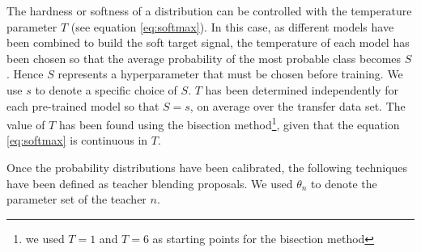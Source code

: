 \documentclass{elsarticle}
\begin{document}
	 The hardness or softness of a distribution can be controlled with the temperature parameter $T$ (see equation \ref{eq:softmax}). In this case, as different models have been combined to build the soft target signal, the temperature of each model has been chosen so that the average probability of the most probable class becomes $S$. Hence $S$ represents a hyperparameter that must be chosen before training. We use $s$ to denote a specific choice of $S$.  $T$ has been determined independently for each pre-trained model so that $S=s$, on average over the transfer data set. The value of $T$ has been found using the bisection method\footnote{we used $T=1$ and $T=6$ as starting points for the bisection method}, given that the equation \ref{eq:softmax} is continuous in $T$.

	 Once the probability distributions have been calibrated, the following techniques have been defined as teacher blending proposals. We used $\theta_n$ to denote the parameter set of the teacher $n$. 
\end{document}
